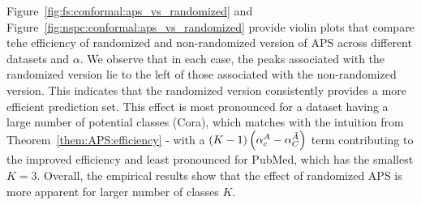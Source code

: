 Figure~\ref{fig:fs:conformal:aps_vs_randomized} and Figure~\ref{fig:nspc:conformal:aps_vs_randomized} provide violin plots that compare tehe efficiency of randomized and non-randomized version of APS across different datasets and $\alpha$.
We observe that in each case, the peaks associated with the randomized version lie to the left of those associated with the non-randomized version.
This indicates that the randomized version consistently provides a more efficient prediction set.
This effect is most pronounced for a dataset having a large number of potential classes (Cora), which matches with the intuition from Theorem~\ref{them:APS:efficiency} - with a $(K-1)\left(\alpha_c^{A} - \alpha_C^{\Tilde{A}}\right)$ term contributing to the improved efficiency and least pronounced for PubMed, which has the smallest $K=3$.
Overall, the empirical results show that the effect of randomized APS is more apparent for larger number of classes $K$.

